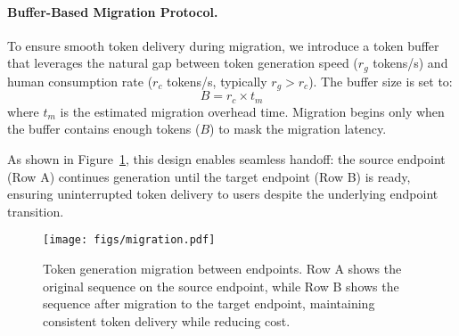 \paragraph{Buffer-Based Migration Protocol.}
To ensure smooth token delivery during migration, we introduce a token buffer that leverages the natural gap between token generation speed ($r_g$ tokens/s) and human consumption rate ($r_c$ tokens/s, typically $r_g > r_c$). The buffer size is set to:
\begin{equation}
    B = r_c \times t_m
\end{equation}
where $t_m$ is the estimated migration overhead time. Migration begins only when the buffer contains enough tokens ($B$) to mask the migration latency.

As shown in Figure~\ref{fig:cost_saving}, this design enables seamless handoff: the source endpoint (Row A) continues generation until the target endpoint (Row B) is ready, ensuring uninterrupted token delivery to users despite the underlying endpoint transition.

\begin{figure}[t]
    \centering
    \texttt{[image: figs/migration.pdf]}
    \caption{Token generation migration between endpoints. Row A shows the original sequence on the source endpoint, while Row B shows the sequence after migration to the target endpoint, maintaining consistent token delivery while reducing cost.}
    \label{fig:cost_saving}
\end{figure}
